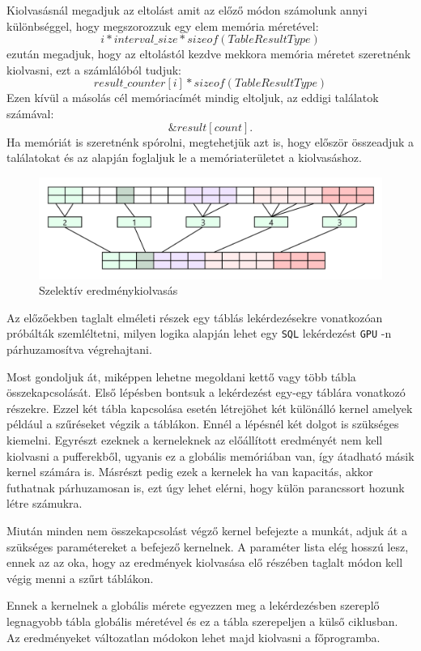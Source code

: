 Kiolvasásnál megadjuk az eltolást amit az előző módon számolunk annyi különbséggel, hogy megszorozzuk egy elem memória méretével:
$$i * interval\_size * sizeof(TableResultType)$$ezután megadjuk, hogy az eltolástól kezdve mekkora memória méretet szeretnénk kiolvasni, ezt a számlálóból tudjuk: $$result\_counter[i] * sizeof(TableResultType)$$Ezen kívül a másolás cél memóriacímét mindig eltoljuk, az eddigi találatok számával: $$\&result[count].$$
Ha memóriát is szeretnénk spórolni, megtehetjük azt is, hogy először összeadjuk a találatokat és az alapján foglaljuk le a memóriaterületet a kiolvasáshoz.
\begin{figure}[h!]
\centering
\includegraphics[width=\textwidth]{images/copy_02.png}
\caption{Szelektív eredménykiolvasás}
\label{fig:opencl}
\end{figure}
\newpage
{}

Az előzőekben taglalt elméleti részek egy táblás lekérdezésekre vonatkozóan próbálták szemléltetni, milyen logika alapján lehet egy \texttt{SQL} lekérdezést \texttt{GPU} -n párhuzamosítva végrehajtani.

Most gondoljuk át, miképpen lehetne megoldani kettő vagy több tábla összekapcsolását. 
Első lépésben bontsuk a lekérdezést egy-egy táblára vonatkozó részekre. Ezzel két tábla kapcsolása esetén létrejöhet két különálló kernel amelyek például a szűréseket végzik a táblákon. Ennél a lépésnél két dolgot is szükséges kiemelni. Egyrészt ezeknek a kerneleknek az előállított eredményét nem kell kiolvasni a pufferekből, ugyanis ez a globális memóriában van, így átadható másik kernel számára is. Másrészt pedig ezek a kernelek ha van kapacitás, akkor futhatnak párhuzamosan is, ezt úgy lehet elérni, hogy külön parancssort hozunk létre számukra.

Miután minden nem összekapcsolást végző kernel befejezte a munkát, adjuk át a szükséges paramétereket a befejező kernelnek. A paraméter lista elég hosszú lesz, ennek az az oka, hogy az eredmények kiolvasása elő részében taglalt módon kell végig menni a szűrt táblákon. 

Ennek a kernelnek a globális mérete egyezzen meg a lekérdezésben szereplő legnagyobb tábla globális méretével és ez a tábla szerepeljen a külső ciklusban. Az eredményeket változatlan módokon lehet majd kiolvasni a főprogramba.

